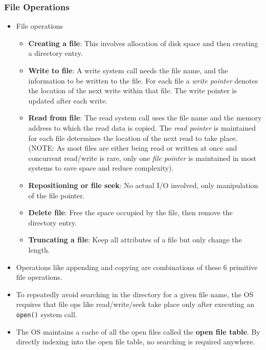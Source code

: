 \documentclass{article}
\theoremstyle{plain}
\theoremstyle{definition}
\begin{document}
\subsubsection{File Operations}
\begin{itemize}
    \item File operations
    \begin{itemize}
        \item \textbf{Creating a file}: This involves allocation of disk space and then creating a directory entry.
        
        \item \textbf{Write to file}: A write system call needs the file name, and the information to be written to the file. For each file a \textit{write pointer} denotes the location of the next write within that file. The write pointer is updated after each write.
        
        \item \textbf{Read from file}: The read system call uses the file name and the memory address to which the read data is copied. The \textit{read pointer} is maintained for each file determines the location of the next read to take place. (NOTE: As most files are either being read or written at once and concurrent read/write is rare, only one \textit{file pointer} is maintained in most systems to save space and reduce complexity).
        
        \item \textbf{Repositioning or file seek}: No actual I/O involved, only manipulation of the file pointer.
        
        \item \textbf{Delete file}: Free the space occupied by the file, then remove the directory entry.
        
        \item \textbf{Truncating a file}: Keep all attributes of a file but only change the length. 
    \end{itemize}
    
    \item Operations like appending and copying are combinations of these 6 primitive file operations. 
    
    \item To repeatedly avoid searching in the directory for a given file name, the OS requires that file ops like read/write/seek take place only after executing an \texttt{open()} system call. 
    
    \item The OS maintains a cache of all the open files called the \textbf{open file table}. By directly indexing into the open file table, no searching is required anywhere.
    

\end{itemize}
\end{document}
